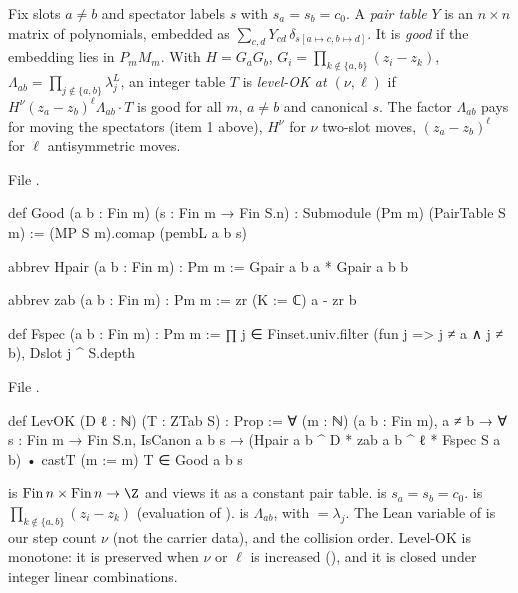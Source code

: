 \begin{definition}\label{l24:def:levok}
Fix slots $a\neq b$ and spectator labels $s$ with $s_a=s_b=c_0$. A \emph{pair table} $Y$ is an $n\times n$ matrix of
polynomials, embedded as $\sum_{c,d}Y_{cd}\,\delta_{s[a\mapsto c,b\mapsto d]}$. It is \emph{good} if the embedding lies
in $P_mM_m$. With $H=G_aG_b$, $G_i=\prod_{k\notin\{a,b\}}(z_i-z_k)$, $\Lambda_{ab}=\prod_{j\notin\{a,b\}}\lambda_j^L$, an integer
table $T$ is \emph{level-OK at $(\nu,\ell)$} if $H^\nu(z_a-z_b)^\ell\Lambda_{ab}\cdot T$ is good for all $m$, $a\neq b$ and canonical $s$.
The factor $\Lambda_{ab}$ pays for moving the spectators (item 1 above), $H^\nu$ for $\nu$ two-slot moves, $(z_a-z_b)^\ell$ for
$\ell$ antisymmetric moves.
\end{definition}
\noindent File .
\begin{leancode}
def Good (a b : Fin m) (s : Fin m → Fin S.n) : Submodule (Pm m) (PairTable S m) :=
  (MP S m).comap (pembL a b s)

abbrev Hpair (a b : Fin m) : Pm m := Gpair a b a * Gpair a b b

abbrev zab (a b : Fin m) : Pm m := zr (K := ℂ) a - zr b

def Fspec (a b : Fin m) : Pm m :=
  ∏ j ∈ Finset.univ.filter (fun j => j ≠ a ∧ j ≠ b), Dslot j ^ S.depth
\end{leancode}
\noindent File .
\begin{leancode}
def LevOK (D ℓ : ℕ) (T : ZTab S) : Prop :=
  ∀ (m : ℕ) (a b : Fin m), a ≠ b → ∀ s : Fin m → Fin S.n, IsCanon a b s →
    (Hpair a b ^ D * zab a b ^ ℓ * Fspec S a b) • castT (m := m) T ∈ Good a b s
\end{leancode}

\begin{dictionary}
 is $\mathrm{Fin}\,n\times\mathrm{Fin}\,n\to\Z$ and  views it as a constant pair table.
 is $s_a=s_b=c_0$.  is $\prod_{k\notin\{a,b\}}(z_i-z_k)$ (evaluation of
).  is $\Lambda_{ab}$, with  $=\lambda_j$. The Lean variable  of  is our
step count $\nu$ (not the carrier data), and  the collision order. Level-OK is monotone: it is preserved when $\nu$ or $\ell$
is increased (), and it is closed under integer linear combinations.
\end{dictionary}

